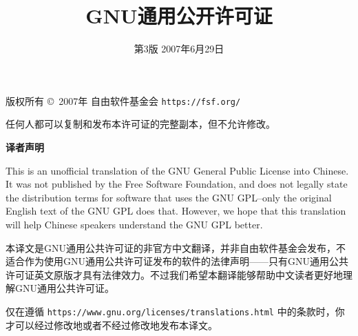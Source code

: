 \documentclass[11pt]{article}
\title{GNU通用公开许可证}
\date{第3版 \space 2007年6月29日}
\begin{document}
\maketitle

\begin{center}
  {\parindent 0in

    版权所有 \copyright\  2007年 自由软件基金会 \texttt{https://fsf.org/}

    \bigskip
    任何人都可以复制和发布本许可证的完整副本，但不允许修改。}

\end{center}
\begin{center}
  {\bf\large 译者声明}
\end{center}

This is an unofficial translation of the GNU General Public License into Chinese. It was not published by the Free Software Foundation, and does not legally state the distribution terms for software that uses the GNU GPL--only the original English text of the GNU GPL does that. However, we hope that this translation will help Chinese speakers understand the GNU GPL better.

本译文是GNU通用公共许可证的非官方中文翻译，并非自由软件基金会发布，不适合作为使用GNU通用公共许可证发布的软件的法律声明——只有GNU通用公共许可证英文原版才具有法律效力。不过我们希望本翻译能够帮助中文读者更好地理解GNU通用公共许可证。

仅在遵循 \texttt{https://www.gnu.org/licenses/translations.html} 中的条款时，你才可以经过修改地或者不经过修改地发布本译文。

\pagebreak
\end{document}
